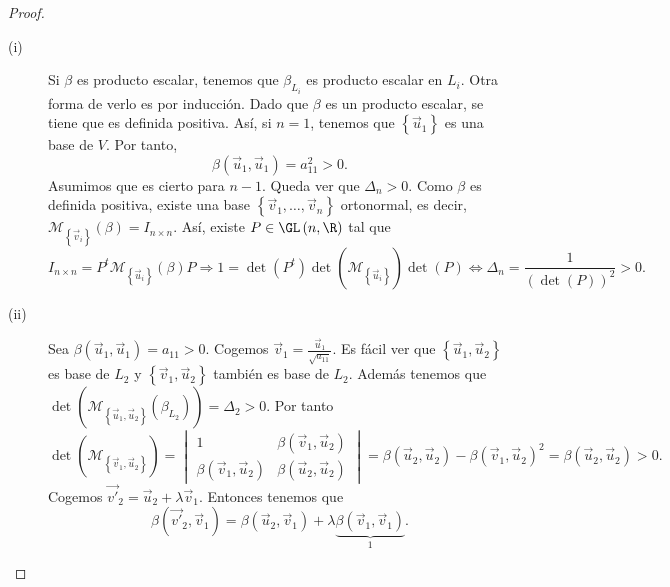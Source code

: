 \begin{proof}
\begin{description}
	\item[(i)] Si $\displaystyle \beta  $ es producto escalar, tenemos que $\displaystyle \beta_{L_{i}} $ es producto escalar en $\displaystyle L_{i} $. Otra forma de verlo es por inducción. Dado que $\displaystyle \beta  $ es un producto escalar, se tiene que es definida positiva. Así, si $\displaystyle n = 1 $, tenemos que $\displaystyle \left\{ \vec{u}_{1}\right\}  $ es una base de $\displaystyle V $. Por tanto,
\[\beta\left(\vec{u}_{1}, \vec{u}_{1}\right) = a_{11}^{2} > 0 .\]
Asumimos que es cierto para $\displaystyle n-1 $. Queda ver que $\displaystyle \Delta_{n} > 0 $. Como $\displaystyle \beta  $ es definida positiva, existe una base $\displaystyle \left\{ \vec{v}_{1}, \ldots, \vec{v}_{n}\right\}  $ ortonormal, es decir, $\displaystyle \mathcal{M}_{ \left\{ \vec{v}_{i}\right\} }\left(\beta \right) = I_{n \times n} $. Así, existe $\displaystyle P \in \GL\left(n,\R \right) $ tal que
\[ I_{n \times n} = P^{t}\mathcal{M}_{ \left\{ \vec{u}_{i}\right\} }\left(\beta \right) P \Rightarrow 1 = \det\left(P^{t}\right)\det\left(\mathcal{M}_{ \left\{ \vec{u}_{i}\right\} }\right)\det\left(P\right) \iff \Delta_{n} = \frac{1}{\left(\det\left(P\right)\right)^{2}} > 0 .\]
\item[(ii)] Sea $\displaystyle \beta\left(\vec{u}_{1},\vec{u}_{1}\right) = a_{11}>0 $. Cogemos $\displaystyle \vec{v}_{1} = \frac{\vec{u}_{1}}{\sqrt{a_{11}}} $. Es fácil ver que $\displaystyle \left\{ \vec{u}_{1}, \vec{u}_{2}\right\}  $ es base de $\displaystyle L_{2} $ y $\displaystyle \left\{ \vec{v}_{1}, \vec{u}_{2}\right\}  $ también es base de $\displaystyle L_{2} $. 	
	Además tenemos que $\displaystyle \det\left(\mathcal{M}_{ \left\{ \vec{u}_{1}, \vec{u}_{2}\right\} }\left(\beta_{L_{2}}\right)\right) = \Delta_{2} > 0 $. Por tanto
	\[ \det\left(\mathcal{M}_{ \left\{ \vec{v}_{1}, \vec{u}_{2}\right\} }\right) = \begin{vmatrix} 1 & \beta\left(\vec{v}_{1}, \vec{u}_{2}\right) \\
	\beta\left(\vec{v}_{1}, \vec{u}_{2}\right) & \beta\left(\vec{u}_{2}, \vec{u}_{2}\right)\end{vmatrix} = \beta\left(\vec{u}_{2}, \vec{u}_{2}\right)-\beta\left(\vec{v}_{1}, \vec{u}_{2}\right)^{2} = \beta\left(\vec{u}_{2}, \vec{u}_{2}\right) > 0 .\]
	Cogemos $\displaystyle \vec{v'}_{2} = \vec{u}_{2}+\lambda\vec{v}_{1} $. Entonces tenemos que
	\[\beta\left(\vec{v'}_{2}, \vec{v}_{1}\right) = \beta\left(\vec{u}_{2}, \vec{v}_{1}\right)+\lambda\underbrace{\beta\left(\vec{v}_{1}, \vec{v}_{1}\right)}_{1} .\]

\end{description}
\end{proof}
